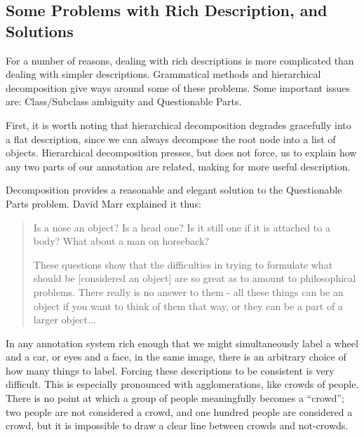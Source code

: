 \subsection{Some Problems with Rich Description, and Solutions}

For a number of reasons, dealing with rich descriptions is more
complicated than dealing with simpler descriptions. Grammatical
methods and hierarchical decomposition give ways around some of these
problems. Some important issues are: Class/Subclass ambiguity
and Questionable Parts.

First, it is worth noting that hierarchical decomposition degrades
gracefully into a flat description, since we can always decompose the
root node into a list of objects. Hierarchical decomposition presses,
but does not force, us to explain how any two parts of our annotation
are related, making for more useful description.

\bitem

\item Decomposition provides a reasonable and elegant solution to the
  Questionable Parts problem. David Marr explained it thus:
  \begin{quote}



    Is a nose an object? Is a head one?  Is it still one if it is
    attached to a body?  What about a man on horseback?

    These questions show that the difficulties in trying to formulate
    what should be [considered an object] %
    are so great as to amount to philosophical problems.  There really
    is no answer to them - all these things can be an object if you
    want to think of them that way, or they can be a part of a larger
    object...%
    \cite{marr}
  \end{quote}

  In any annotation system rich enough that we might simultaneously
  label a wheel and a car, or eyes and a face, in the same image,
  there is an arbitrary choice of how many things to label. Forcing
  these descriptions to be consistent is very
  difficult. \cite{labelme} This is especially pronounced with
  agglomerations, like crowds of people. There is no point at which a
  group of people meaningfully becomes a ``crowd''; two people are not
  considered a crowd, and one hundred people are considered a crowd,
  but it is impossible to draw a clear line between crowds and
  not-crowds.

